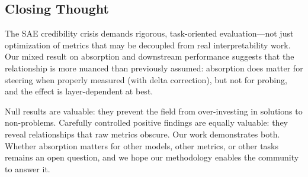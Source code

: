 \documentclass{article}
\begin{document}
\subsection{Closing Thought}

The SAE credibility crisis demands rigorous, task-oriented evaluation---not just optimization of metrics that may be decoupled from real interpretability work. Our mixed result on absorption and downstream performance suggests that the relationship is more nuanced than previously assumed: absorption does matter for steering when properly measured (with delta correction), but not for probing, and the effect is layer-dependent at best.

Null results are valuable: they prevent the field from over-investing in solutions to non-problems. Carefully controlled positive findings are equally valuable: they reveal relationships that raw metrics obscure. Our work demonstrates both. Whether absorption matters for other models, other metrics, or other tasks remains an open question, and we hope our methodology enables the community to answer it.



\end{document}
